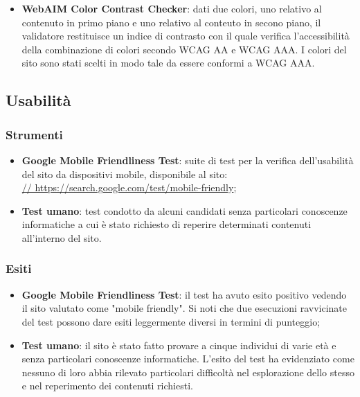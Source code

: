 \documentclass[12pt]{article}
\begin{document}
\begin{itemize}
		\item \textbf{WebAIM Color Contrast Checker}: dati due colori, uno relativo al contenuto in primo piano e uno relativo al conteuto in secono piano, il validatore restituisce un indice di contrasto con il quale verifica l'accessibilità della combinazione di colori secondo WCAG AA e WCAG AAA. I colori del sito sono stati scelti in modo tale da essere conformi a WCAG AAA. 
	\end{itemize}
	
	\subsection{Usabilità}
	
	\subsubsection{Strumenti}
	
	\begin{itemize}
		\item \textbf{Google Mobile Friendliness Test}: suite di test per la verifica dell'usabilità del sito da dispositivi mobile, disponibile al sito:
		\\ \url{// https://search.google.com/test/mobile-friendly};
		
		\item \textbf{Test umano}: test condotto da alcuni candidati senza particolari conoscenze informatiche a cui è stato richiesto di reperire determinati contenuti all'interno del sito.
	\end{itemize}

	\subsubsection{Esiti}
	
	\begin{itemize}
		\item \textbf{Google Mobile Friendliness Test}: il test ha avuto esito positivo vedendo il sito valutato come "mobile friendly". Si noti che due esecuzioni ravvicinate del test possono dare esiti leggermente diversi in termini di punteggio;
		
		\item \textbf{Test umano}: il sito è stato fatto provare a cinque individui di varie età e senza particolari conoscenze informatiche. L'esito del test ha evidenziato come nessuno di loro abbia rilevato particolari difficoltà nel esplorazione dello stesso e nel reperimento dei contenuti richiesti. 
	\end{itemize}
	
\end{document}
